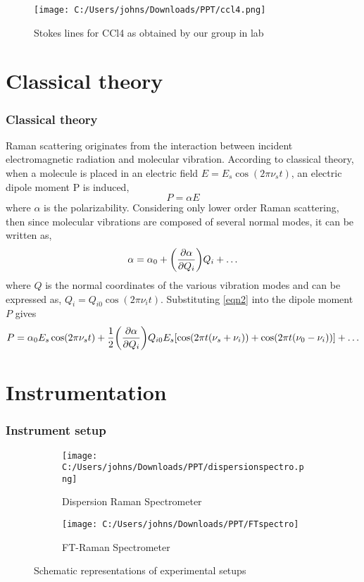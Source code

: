 \documentclass{beamer}
\begin{document}
\begin{frame}
\begin{figure}[ht]
  \centering
  \texttt{[image: C:/Users/johns/Downloads/PPT/ccl4.png]}
    \caption{Stokes lines for CCl4 as obtained by our group in lab}
    \label{fig:right}
\end{figure}
\end{frame}

\section{Classical theory}
\begin{frame}
\frametitle{Classical theory}
Raman scattering originates from the interaction between incident electromagnetic radiation and 
molecular vibration. According to classical theory, when a molecule is  placed in an 
electric field $E=E_s \cos(2\pi \nu_{s} t)$, an electric dipole moment P is induced, 
\begin{equation}
P=\alpha E  \label{eq1}
\end{equation}
 where $\alpha$ is the polarizability. Considering only lower order Raman scattering, then since molecular vibrations are composed of several normal modes, it can be written as,
\begin{equation}
\alpha=\alpha_0+\bigg{(}\frac{\partial \alpha}{\partial Q_i}\bigg{)} Q_{i} + \ldots \label{eqn2}
\end{equation}
where $Q$ is the normal coordinates of the various vibration modes and can be expressed as, $Q_{i}=Q_{i0} \cos(2 \pi \nu_{i} t)$. Substituting \eqref{eqn2} into the dipole moment $P$ gives
\begin{equation}
P=\alpha_0 E_s \cos(2\pi \nu_{s} t) + \frac{1}{2} \bigg{(}\frac{\partial \alpha}{\partial Q_i}\bigg{)} Q_{i0} E_{s} [\cos(2\pi t(\nu_{s} +\nu_{i})) + \cos(2\pi t (\nu_0 - \nu_i))] + \ldots  \label{eqn3}
\end{equation}
\end{frame}


\section{Instrumentation}
\begin{frame}
\frametitle{Instrument setup}
\begin{figure}[ht]
  \centering
  \begin{subfigure}[b]{0.5\textwidth}
    \texttt{[image: C:/Users/johns/Downloads/PPT/dispersionspectro.png]}
    \caption{Dispersion Raman Spectrometer}
    \label{fig:left}
  \end{subfigure}%
  \hfill
  \begin{subfigure}[b]{0.5\textwidth}
    \texttt{[image: C:/Users/johns/Downloads/PPT/FTspectro]}
    \caption{FT-Raman Spectrometer}
    \label{fig:right}
  \end{subfigure}
  \caption{Schematic representations of experimental setups}
  \label{fig:both}
\end{figure}
\end{frame}
\end{document}
